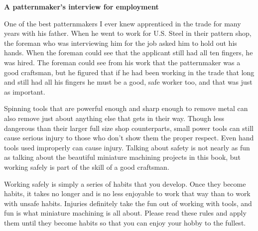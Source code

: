 \secdown\secdown

\textbf{A patternmaker's interview for employment}

\bigskip
One of the best patternmakers I ever knew apprenticed in the trade for many
years with his father. When he went to work for U.S. Steel in their pattern
shop, the foreman who was interviewing him for the job asked him to hold out his
hands. When the foreman could see that the applicant still had all ten fingers,
he was hired. The foreman could see from his work that the patternmaker was a
good craftsman, but he figured that if he had been working in the trade that
long and still had all his fingers he must be a good, safe worker too, and that
was just as important.

Spinning tools that are powerful enough and sharp enough to remove metal can
also remove just about anything else that gets in their way. Though less
dangerous than their larger full size shop counterparts, small power tools can
still cause serious injury to those who don't show them the proper respect. Even
hand tools used improperly can cause injury. Talking about safety is not nearly
as fun as talking about the beautiful miniature machining projects in this book,
but working safely is part of the skill of a good craftsman.

Working safely is simply a series of habits that you develop. Once they become
habits, it takes no longer and is no less enjoyable to work that way than to
work with unsafe habits. Injuries definitely take the fun out of working with
tools, and fun is what miniature machining is all about. Please read these rules
and apply them until they become habits so that you can enjoy your hobby to the
fullest.

